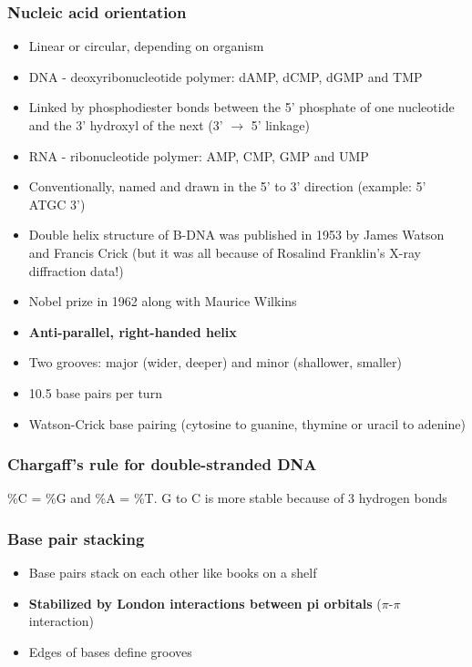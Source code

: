 \documentclass[letterpaper, 12pt]{article}
\begin{document}
\subsubsection*{Nucleic acid orientation}
\begin{itemize}
\item Linear or circular, depending on organism
\item DNA - deoxyribonucleotide polymer: dAMP, dCMP, dGMP and TMP
\item Linked by phosphodiester bonds between the 5' phosphate of one nucleotide and the 3' hydroxyl of the next (3' $\to$ 5' linkage)
\item RNA - ribonucleotide polymer: AMP, CMP, GMP and UMP
\item Conventionally, named and drawn in the 5' to 3' direction (example: 5' ATGC 3')
\item Double helix structure of B-DNA was published in 1953 by James Watson and Francis Crick (but it was all because of Rosalind Franklin's X-ray diffraction data!)
\item Nobel prize in 1962 along with Maurice Wilkins
\item \textbf{Anti-parallel, right-handed helix}
\item Two grooves: major (wider, deeper) and minor (shallower, smaller)
\item 10.5 base pairs per turn
\item Watson-Crick base pairing (cytosine to guanine, thymine or uracil to adenine)
\end{itemize}

\subsubsection*{Chargaff's rule for double-stranded DNA}
\%C = \%G and \%A = \%T. G to C is more stable because of 3 hydrogen bonds

\subsubsection*{Base pair stacking}
\begin{itemize}
\item Base pairs stack on each other like books on a shelf
\item \textbf{Stabilized by London interactions between pi orbitals} ($\pi$-$\pi$ interaction)
\item Edges of bases define grooves
\end{itemize}
\end{document}
